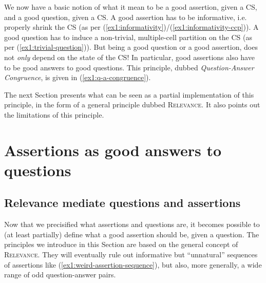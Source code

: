 \begin{exe}
	\label{ex1:trivial-question}
\end{exe}

We now have a basic notion of what it mean to be a good assertion, given a CS, and a good question, given a CS. A good assertion has to be informative, i.e. properly shrink the CS (as per (\ref{ex1:informativity})/(\ref{ex1:informativity-ccp})). A good question has to induce a non-trivial, multiple-cell partition on the CS (as per (\ref{ex1:trivial-question})). But being a good question or a good assertion, does not \textit{only} depend on the state of the CS! In particular, good assertions also have to be good answers to good questions. This principle, dubbed \textit{Question-Answer Congruence}, is given in (\ref{ex1:q-a-congruence}).

\begin{exe}
	\label{ex1:q-a-congruence}
\end{exe}

The next Section presents what can be seen as a partial implementation of this principle, in the form of a general principle dubbed \textsc{Relevance}. It also points out the limitations of this principle.


\section{Assertions as good answers to questions}\label{sec:q-a-interaction}


\subsection{Relevance mediate questions and assertions}
Now that we precisified what assertions and questions are, it becomes possible to (at least partially) define what a good assertion should be, given a question. The principles we introduce in this Section are based on the general concept of \textsc{Relevance}. They will eventually rule out informative but ``unnatural'' sequences of assertions like (\ref{ex1:weird-assertion-sequence}), but also, more generally, a wide range of odd question-answer pairs.

